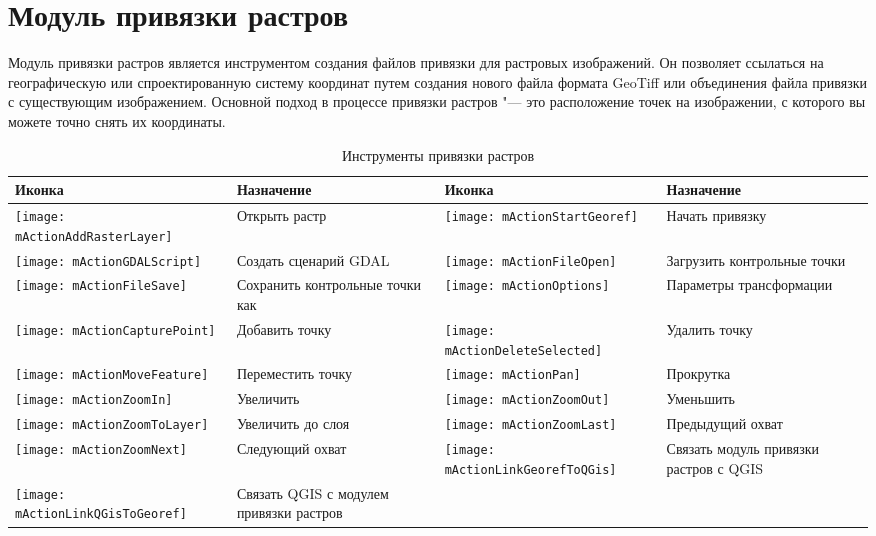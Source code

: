 
\section{Модуль привязки растров}\label{sec:georef}


Модуль привязки растров является инструментом создания файлов привязки
для растровых изображений. Он позволяет ссылаться на географическую или
спроектированную систему координат путем создания нового файла формата
GeoTiff или объединения файла привязки с существующим изображением.
Основной подход в процессе привязки растров "--- это расположение точек на
изображении, с которого вы можете точно снять их координаты.


\begin{table}[h]
\begin{tabular}{|m{1cm}|m{6cm}|m{1cm}|m{6cm}|}
 \hline \textbf{Иконка} & \textbf{Назначение} & \textbf{Иконка} &
 \textbf{Назначение} \\
 \hline \texttt{[image: mActionAddRasterLayer]} & Открыть растр &
 \texttt{[image: mActionStartGeoref]} & Начать привязку \\
 \hline \texttt{[image: mActionGDALScript]} & Создать сценарий GDAL &
 \texttt{[image: mActionFileOpen]} & Загрузить контрольные точки \\
 \hline \texttt{[image: mActionFileSave]} & Сохранить контрольные точки как &
 \texttt{[image: mActionOptions]} & Параметры трансформации \\
 \hline \texttt{[image: mActionCapturePoint]} & Добавить точку &
 \texttt{[image: mActionDeleteSelected]} & Удалить точку \\
 \hline \texttt{[image: mActionMoveFeature]} & Переместить точку &
\texttt{[image: mActionPan]} & Прокрутка \\
 \hline \texttt{[image: mActionZoomIn]} & Увеличить &
 \texttt{[image: mActionZoomOut]} & Уменьшить \\
 \hline \texttt{[image: mActionZoomToLayer]} & Увеличить до слоя &
 \texttt{[image: mActionZoomLast]} & Предыдущий охват \\
 \hline \texttt{[image: mActionZoomNext]} & Следующий охват &
 \texttt{[image: mActionLinkGeorefToQGis]} & Связать модуль привязки растров с QGIS \\
 \hline \texttt{[image: mActionLinkQGisToGeoref]} & Связать QGIS с модулем привязки растров &
 &  \\
\hline
\end{tabular}
\caption{Инструменты привязки растров}\label{tab:georeferencer_tools}
\end{table}

